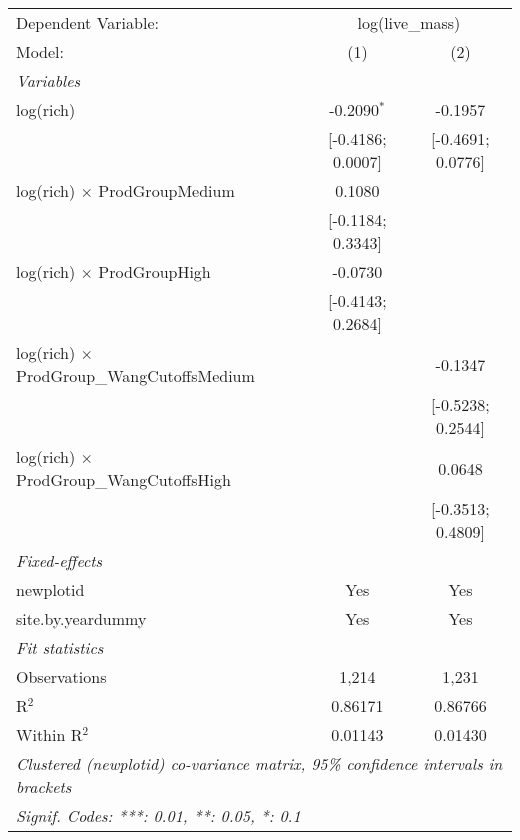 \begin{tabular}{lcc}
\tabularnewline\midrule\midrule
Dependent Variable:&\multicolumn{2}{c}{log(live\_mass)}\\
Model:&(1) & (2)\\
\midrule \emph{Variables}&   &  \\
log(rich) & -0.2090$^{*}$ & -0.1957\\
  &[-0.4186; 0.0007] & [-0.4691; 0.0776]\\
log(rich) $\times $ ProdGroupMedium & 0.1080 &   \\
  &[-0.1184; 0.3343] &   \\
log(rich) $\times $ ProdGroupHigh & -0.0730 &   \\
  &[-0.4143; 0.2684] &   \\
log(rich) $\times $ ProdGroup\_WangCutoffsMedium &    & -0.1347\\
  &   & [-0.5238; 0.2544]\\
log(rich) $\times $ ProdGroup\_WangCutoffsHigh &    & 0.0648\\
  &   & [-0.3513; 0.4809]\\
\midrule \emph{Fixed-effects}&   &  \\
newplotid & Yes & Yes\\
site.by.yeardummy & Yes & Yes\\
\midrule \emph{Fit statistics}&  & \\
Observations & 1,214&1,231\\
R$^2$ & 0.86171&0.86766\\
Within R$^2$ & 0.01143&0.01430\\
\midrule\midrule\multicolumn{3}{l}{\emph{Clustered (newplotid) co-variance matrix, 95\% confidence intervals in brackets}}\\
\multicolumn{3}{l}{\emph{Signif. Codes: ***: 0.01, **: 0.05, *: 0.1}}\\
\end{tabular}


